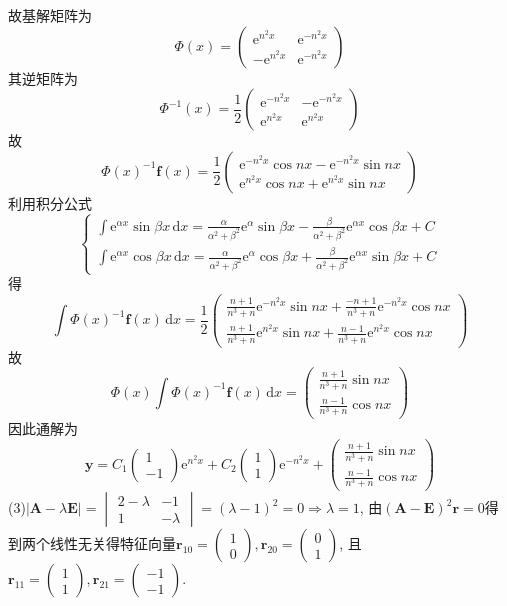 \documentclass[titlepage,11pt,a4paper,twoside]{report}
\makeatletter
\newcommand\diff{\,\mathrm{d}}
\newcommand\e{\mathrm{e}}
\newcommand\bmitPhi{\bm{\varPhi}}
\newenvironment{solve}{\par
	\pushQED{\qed}%
	\normalfont \topsep1\p@\@plus6\p@\relax
	\trivlist
	\item\relax
	{\hspace*{\parindent}{\heiti 解}\@addpunct{:}}\hspace\labelsep\ignorespaces
}{%
	\popQED\endtrivlist\@endpefalse
}
\makeatother
\begin{document}
\begin{solve}
故基解矩阵为
\[\bmitPhi(x)=\begin{pmatrix}\e^{n^2x}&\e^{-n^2x}\\-\e^{n^2x}&\e^{-n^2x}\end{pmatrix}\]
其逆矩阵为
\[\bmitPhi^{-1}(x)=\frac{1}{2}\begin{pmatrix}\e^{-n^2x}&-\e^{-n^2x}\\\e^{n^2x}&\e^{n^2x}\end{pmatrix}\]
故\[\bmitPhi(x)^{-1}\bm{f}(x)=\frac{1}{2}\begin{pmatrix}\e^{-n^2x}\cos nx-\e^{-n^2x}\sin nx\\\e^{n^2x}\cos nx+\e^{n^2x}\sin nx\end{pmatrix}\]
利用积分公式\[\begin{cases}\displaystyle
\int\e^{\alpha x}\sin\beta x\diff x=\frac{\alpha}{\alpha^2+\beta^2}\e^{\alpha}\sin\beta x-\frac{\beta}{\alpha^2+\beta^2}\e^{\alpha x}\cos\beta x+C\\
\displaystyle\int\e^{\alpha x}\cos\beta x\diff x=\frac{\alpha}{\alpha^2+\beta^2}\e^{\alpha}\cos\beta x+\frac{\beta}{\alpha^2+\beta^2}\e^{\alpha x}\sin\beta x+C
\end{cases}\]
得\[\int\bmitPhi(x)^{-1}\bm{f}(x)\diff x=\frac{1}{2}\begin{pmatrix}\frac{n+1}{n^3+n}\e^{-n^2x}\sin nx+\frac{-n+1}{n^3+n}\e^{-n^2x}\cos nx\\
\frac{n+1}{n^3+n}\e^{n^2x}\sin nx+\frac{n-1}{n^3+n}\e^{n^2x}\cos nx
\end{pmatrix}\]
故\[\bmitPhi(x)\int\bmitPhi(x)^{-1}\bm{f}(x)\diff x=\begin{pmatrix}\frac{n+1}{n^3+n}\sin nx\\
\frac{n-1}{n^3+n}\cos nx\end{pmatrix}\]
因此通解为\[\bm{y}=C_1\begin{pmatrix}1\\-1\end{pmatrix}\e^{n^2x}+C_2\begin{pmatrix}1\\1\end{pmatrix}\e^{-n^2x}+\begin{pmatrix}\frac{n+1}{n^3+n}\sin nx\\
\frac{n-1}{n^3+n}\cos nx\end{pmatrix}\]
(3)$|\bm{A}-\lambda\bm{E}|=\begin{vmatrix}2-\lambda&-1\\1&-\lambda\end{vmatrix}=(\lambda-1)^2=0\Rightarrow\lambda=1$, 由$(\bm{A}-\bm{E})^2\bm{r}=0$得到两个线性无关得特征向量$\bm{r}_{10}=\begin{pmatrix}1\\0\end{pmatrix},\bm{r}_{20}=\begin{pmatrix}0\\1\end{pmatrix}$, 且$\bm{r}_{11}=\begin{pmatrix}1\\1\end{pmatrix},\bm{r}_{21}=\begin{pmatrix}-1\\-1\end{pmatrix}$.\\

\end{solve}
\end{document}
